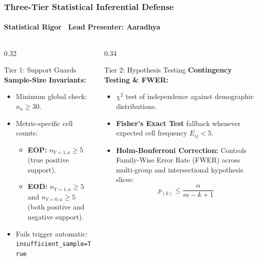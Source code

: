 \begin{frame}
  \frametitle{Three-Tier Statistical Inferential Defense}
  \framesubtitle{Statistical Rigor \textbar\ Lead Presenter: Aaradhya}

  \begin{columns}[T]
    \begin{column}{0.32\textwidth}
      \begin{statcard}{Tier 1: Support Guards}
        \footnotesize
        \textbf{Sample-Size Invariants:}
        \begin{itemize}\scriptsize
          \item Minimum global check: $n_a \ge 30$.
          \item Metric-specific cell counts:
            \begin{itemize}\tiny
              \item \textbf{EOP:} $n_{Y=1, a} \ge 5$ (true positive support).
              \item \textbf{EOD:} $n_{Y=1, a} \ge 5$ and $n_{Y=0, a} \ge 5$ (both positive and negative support).
            \end{itemize}
          \item Fails trigger automatic:
          \texttt{insufficient\_sample=True}
        \end{itemize}
      \end{statcard}
    \end{column}

    \begin{column}{0.34\textwidth}
      \begin{card}{Tier 2: Hypothesis Testing}
        \footnotesize
        \textbf{Contingency Testing \& FWER:}
        \begin{itemize}\scriptsize
          \item $\chi^2$ test of independence against demographic distributions.
          \item \textbf{Fisher's Exact Test} fallback whenever expected cell frequency $E_{ij} < 5$.
          \item \textbf{Holm-Bonferroni Correction:} Controls Family-Wise Error Rate (FWER) across multi-group and intersectional hypothesis slices:
          $$p_{(k)} \le \frac{\alpha}{m - k + 1}$$
        \end{itemize}
      \end{card}
    \end{column}


\end{columns}
\end{frame}
